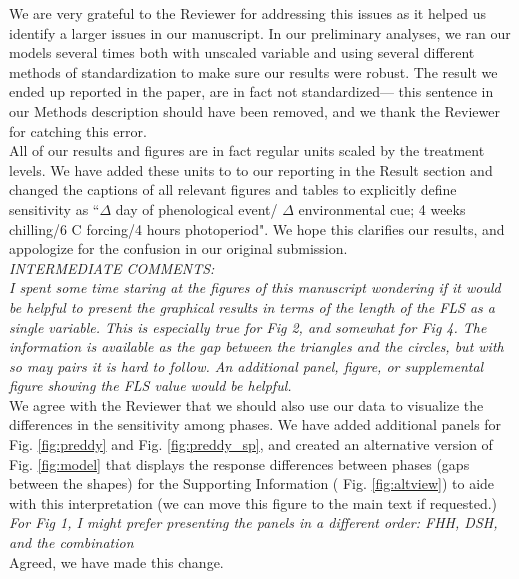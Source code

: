 \documentclass[11pt]{article}
\begin{document}
\noindent We are very grateful to the Reviewer for addressing this issues as it helped us identify a larger issues in our manuscript. In our preliminary analyses, we ran our models several times both with unscaled variable and using several different methods of standardization to make sure our results were robust. The result we ended up reported in the paper, are in fact not standardized--- this sentence in our Methods description should have been removed, and we thank the Reviewer for catching this error.\\

\noindent All of our results and figures are in fact regular units scaled by the treatment levels. We have added these units to to our reporting in the Result section and changed the captions of all relevant figures and tables to explicitly define sensitivity as ``$\Delta$ day of phenological event/ $\Delta$ environmental cue; 4 weeks chilling/6 \degree C forcing/4 hours photoperiod". We hope this clarifies our results, and appologize for the confusion in our original submission.\\ 

\emph{INTERMEDIATE COMMENTS:}\\
\emph{I spent some time staring at the figures of this manuscript wondering if it would be helpful to present the graphical results in terms of the length of the FLS as a single variable. This is especially true for Fig 2, and somewhat for Fig 4. The information is available as the gap between the triangles and the circles, but with so may pairs it is hard to follow. An additional panel, figure, or supplemental figure showing the FLS value would be helpful.}\\

We agree with the Reviewer that we should also use our data to visualize the differences in the sensitivity among phases. We have added additional panels for Fig. \ref{fig:preddy} and Fig. \ref{fig:preddy_sp}, and created an alternative version of Fig. \ref{fig:model} that displays the response differences between phases (gaps between the shapes) for the Supporting Information ( Fig. \ref{fig:altview}) to aide with this interpretation (we can move this figure to the main text if requested.) \\ 

\emph{For Fig 1, I might prefer presenting the panels in a different order: FHH, DSH, and the combination}\\

\noindent Agreed, we have made this change.\\
\end{document}
